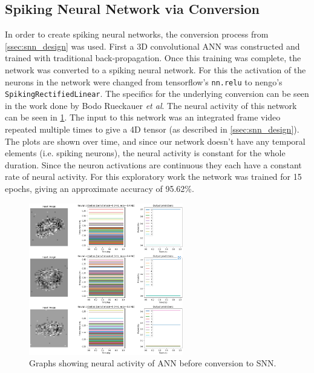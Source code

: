 \subsection{Spiking Neural Network via Conversion} \label{ssec:ann_to_snn_implementation}

In order to create spiking neural networks, the conversion process from \cref{ssec:snn_design} was used. First a 3D convolutional ANN was constructed and trained with traditional back-propagation. Once this training was complete, the network was converted to a spiking neural network. For this the activation of the neurons in the network were changed from tensorflow's \lstinline{nn.relu} to nengo's \lstinline{SpikingRectifiedLinear}. The specifics for the underlying conversion can be seen in the work done by Bodo Rueckauer \textit{et al}\cite{Ann2Snn}. The neural activity of this network can be seen in \cref{fig:pre_snn_conversion}. The input to this network was an integrated frame video repeated multiple times to give a 4D tensor (as described in \cref{ssec:snn_design}). The plots are shown over time, and since our network doesn't have any temporal elements (i.e. spiking neurons), the neural activity is constant for the whole duration. Since the neuron activations are continuous they each have a constant rate of neural activity. For this exploratory work the network was trained for 15 epochs, giving an approximate accuracy of 95.62\%.

\begin{figure}[htb]%
    \centering
    \includegraphics[width=0.6\textwidth]{implementation/images/pre_snn_conversion.png}
    \caption{Graphs showing neural activity of ANN before conversion to SNN.}%
    \label{fig:pre_snn_conversion}%
\end{figure}

